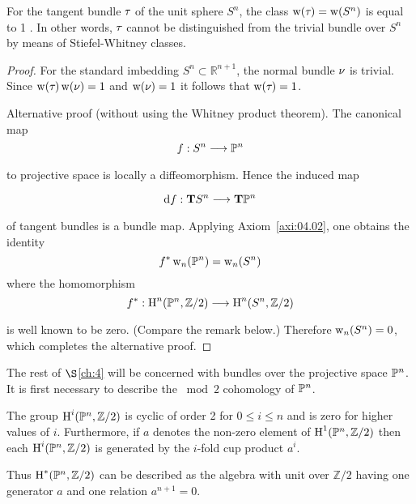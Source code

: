 \documentclass[../main]{subfiles}
\begin{document}
\begin{example}
\label{exa:04.01}
For the tangent bundle $\tau_{}$ of the unit sphere $S^{n}$, the class \newline $\operatorname{w}(\tau_{}) =\operatorname{w}(S^{n})$ is equal to 1 . In other words, $\tau_{}$ cannot be distinguished from the trivial bundle over $S^{n}$ by means of Stiefel-Whitney classes.
\end{example}
\begin{proof}
For the standard imbedding $S^{n} \subset \mathbb{R}^{n+1}$, the normal bundle $\nu_{}$ is trivial. Since $\operatorname{w}(\tau_{}) \operatorname{w}(\nu_{})=1$ and $\operatorname{w}(\nu_{})=1$ it follows that $\operatorname{w}(\tau_{})=1$.


Alternative proof (without using the Whitney product theorem). The \mbox{canonical} map
\[
f: S^{n} \varrightarrow{} \projective^{n}
\]
to projective space is locally a diffeomorphism. Hence the induced map

\[
\tangentbundlemap{f}: \tangentTS S^{n} \varrightarrow{} \tangentTS \projective^{n}
\]
of tangent bundles is a bundle map. Applying Axiom~\ref{axi:04.02}, one obtains the identity
\[
f^{*} \operatorname{w}_{n}(\mathbb{P}^{n})=\operatorname{w}_{n}(S^{n})
\]
where the homomorphism
\[
f^{*}: \homology^{n}(\projective^{n}, \mathbb{Z} / 2) \varrightarrow{} \homology^{n}(S^{n}, \mathbb{Z} / 2)
\]
is well known to be zero. (Compare the remark below.) Therefore $\operatorname{w}_{n}(S^{n})=0$, which completes the alternative proof.

\end{proof}

The rest of $\S $\ref{ch:4} will be concerned with bundles over the projective space $\mathbb{P}^{n}$. It is first necessary to describe the $\bmod 2$ cohomology of $\mathbb{P}^{n}$.

\begin{lemma}
\label{lem:04.03}
The group $\operatorname{H}^i(\mathbb{P}^n, \mathbb{Z} / 2)$ is cyclic of order 2 for $0 \leq i \leq n$ and is zero for higher values of $i$. Furthermore, if $a$ denotes the non-zero element of $\operatorname{H}^1(\mathbb{P}^{n}, \mathbb{Z} / 2)$ then each $\operatorname{H}^i(\mathbb{P}^{n}, \mathbb{Z} / 2)$ is generated by the $i$-fold cup product $a^i$.
\end{lemma}

Thus $\operatorname{H}^*(\mathbb{P}^{n}, \mathbb{Z} / 2)$ can be described as the algebra with unit over $\mathbb{Z} / 2$ having one generator $a$ and one relation $a^{n+1}=0$.
\end{document}
